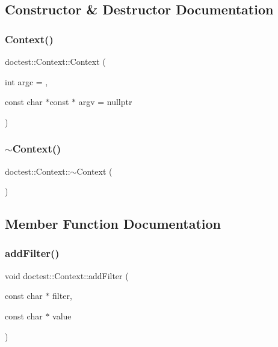 \subsection{Constructor \& Destructor Documentation}
\mbox{\label{classdoctest_1_1_context_a881bc2d0fe207d672e1debe830768a98}} 
\subsubsection{\texorpdfstring{Context()}{Context()}}
{\footnotesize\ttfamily doctest\+::\+Context\+::\+Context (\begin{DoxyParamCaption}\item[{int}]{argc = {},  }\item[{const char $\ast$const $\ast$}]{argv = {\ttfamily nullptr} }\end{DoxyParamCaption})\hspace{0.3cm}{\ttfamily [explicit]}}

\mbox{\label{classdoctest_1_1_context_a33b344fbc4803dca81147c4a4cc9edbd}} 
\subsubsection{\texorpdfstring{$\sim$\+Context()}{~Context()}}
{\footnotesize\ttfamily doctest\+::\+Context\+::$\sim$\+Context (\begin{DoxyParamCaption}{ }\end{DoxyParamCaption})}



\subsection{Member Function Documentation}
\mbox{\label{classdoctest_1_1_context_a60ad57a46c19db2b142468c3acac448a}} 
\subsubsection{\texorpdfstring{add\+Filter()}{addFilter()}}
{\footnotesize\ttfamily void doctest\+::\+Context\+::add\+Filter (\begin{DoxyParamCaption}\item[{const char $\ast$}]{filter,  }\item[{const char $\ast$}]{value }\end{DoxyParamCaption})}

